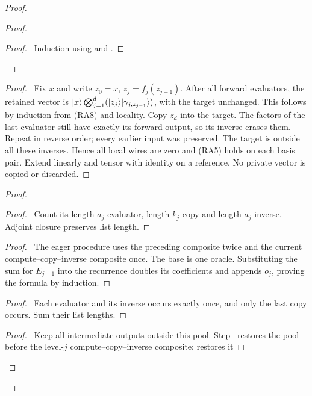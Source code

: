 \begin{proof}
\begin{proof}
  \begin{proof}\pf\ Induction using
   and .
  \end{proof}
 \end{proof}
 \begin{proof}\pf\ Fix $x$ and write $z_0=x$, $z_j=f_j(z_{j-1})$.
 After all forward evaluators, the retained vector is
 $\lvert x\rangle\bigotimes_{j=1}^d
 (\lvert z_j\rangle\lvert \gamma_{j,z_{j-1}}\rangle)$, with the target unchanged.
 This follows by induction from (RA8) and locality. Copy $z_d$ into
 the target. The factors of the last evaluator still have exactly
 its forward output, so its inverse erases them. Repeat in reverse
 order; every earlier input was preserved. The target is outside all
 these inverses. Hence all local wires are zero and (RA5) holds on
 each basis pair. Extend linearly and tensor with identity on a reference.
 No private vector is copied or discarded.\end{proof}
\begin{proof}
 \begin{proof}\pf\ Count its length-$a_j$ evaluator, length-$k_j$
 copy and length-$a_j$ inverse. Adjoint closure preserves list length.
 \end{proof}
 \begin{proof}\pf\ The eager procedure uses the preceding
 composite twice and the current compute--copy--inverse composite once. The base is one
 oracle. Substituting the sum for $E_{j-1}$ into the recurrence
 doubles its coefficients and appends $o_j$, proving the formula
 by induction.\end{proof}
 \begin{proof}\pf\ Each evaluator and its inverse occurs exactly
 once, and only the last copy occurs. Sum their list lengths.
 \end{proof}
 \begin{proof}\pf\ Keep all intermediate outputs outside this
 pool. Step~ restores the pool before
 the level-$j$ compute--copy--inverse composite;  restores it

\end{proof}
\end{proof}
\end{proof}
